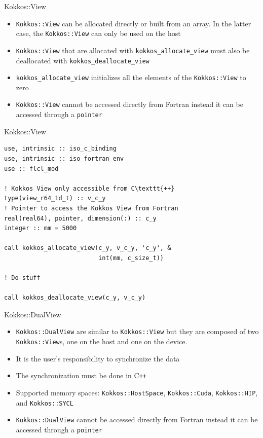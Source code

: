 \begin{frame}{Kokkos::View}
  \begin{itemize}
    \item \texttt{Kokkos::View} can be allocated directly or built from an
      array. In the latter case, the \texttt{Kokkos::View} can only be used on
      the host %
    \item \texttt{Kokkos::View} that are allocated with
      \texttt{kokkos\_allocate\_view} must also be deallocated with
      \texttt{kokkos\_deallocate\_view}
    \item \texttt{kokkos\_allocate\_view} initializes all the elements of the
      \texttt{Kokkos::View} to zero
    \item \texttt{Kokkos::View} cannot be accessed directly from Fortran instead
      it can be accessed through a \texttt{pointer}
  \end{itemize}
\end{frame}

\begin{frame}[containsverbatim]{Kokkos::View}
  \begin{verbatim}
use, intrinsic :: iso_c_binding
use, intrinsic :: iso_fortran_env
use :: flcl_mod

! Kokkos View only accessible from C\texttt{++}
type(view_r64_1d_t) :: v_c_y
! Pointer to access the Kokkos View from Fortran
real(real64), pointer, dimension(:) :: c_y
integer :: mm = 5000

call kokkos_allocate_view(c_y, v_c_y, 'c_y', &
                          int(mm, c_size_t))

! Do stuff

call kokkos_deallocate_view(c_y, v_c_y)
  \end{verbatim}
\end{frame}

\begin{frame}{Kokkos::DualView}
  \begin{itemize}
    \item \texttt{Kokkos::DualView} are similar to \texttt{Kokkos::View} but
      they are composed of two \texttt{Kokkos::View}s, one on the host and one on
      the device.
    \item It is the user's responsibility to synchronize the data
    \item The synchronization must be done in C\texttt{++}
    \item Supported memory spaces: \texttt{Kokkos::HostSpace},
      \texttt{Kokkos::Cuda}, \texttt{Kokkos::HIP}, and \texttt{Kokkos::SYCL}
    \item \texttt{Kokkos::DualView} cannot be accessed directly from Fortran instead
      it can be accessed through a \texttt{pointer}
  \end{itemize}
\end{frame}

